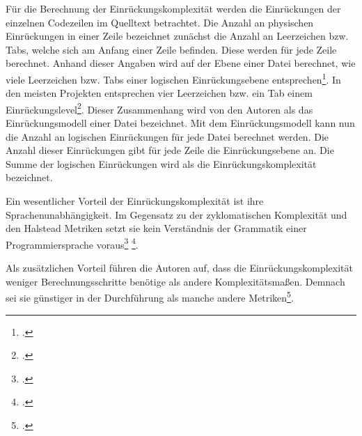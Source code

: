 Für die Berechnung der Einrückungskomplexität werden die Einrückungen
der einzelnen Codezeilen im Quelltext betrachtet. Die Anzahl an
physischen Einrückungen in einer Zeile bezeichnet zunächst die Anzahl an
Leerzeichen bzw. Tabs, welche sich am Anfang einer Zeile befinden. Diese
werden für jede Zeile berechnet. Anhand dieser Angaben wird auf der
Ebene einer Datei berechnet, wie viele Leerzeichen bzw. Tabs einer
logischen Einrückungsebene entsprechen\footcite[Vgl. ][]{hindleReadingLinesUsing2009
  S. 5}. In den meisten Projekten entsprechen vier Leerzeichen bzw. ein
Tab einem Einrückungslevel\footcite[Vgl. ][]{hindleReadingLinesUsing2009 S. 9}.
Dieser Zusammenhang wird von den Autoren als das Einrückungsmodell einer
Datei bezeichnet. Mit dem Einrückungsmodell kann nun die Anzahl an
logischen Einrückungen für jede Datei berechnet werden. Die Anzahl
dieser Einrückungen gibt für jede Zeile die Einrückungsebene an. Die
Summe der logischen Einrückungen wird als die Einrückungskomplexität
bezeichnet.

Ein wesentlicher Vorteil der Einrückungskomplexität ist ihre
Sprachenunabhängigkeit. Im Gegensatz zu der zyklomatischen Komplexität
und den Halstead Metriken setzt sie kein Verständnis der Grammatik einer
Programmiersprache voraus\footcite[Vgl. ][]{hindleReadingLinesUsing2009 S. 1}
\footcite[Vgl. ][]{hindleReadingLinesUsing2009 S. 2}.

Als zusätzlichen Vorteil führen die Autoren auf, dass die
Einrückungskomplexität weniger Berechnungsschritte benötige als andere
Komplexitätsmaßen. Demnach sei sie günstiger in der Durchführung als
manche andere Metriken\footcite[Vgl. ][]{hindleReadingLinesUsing2009 S. 20f}.